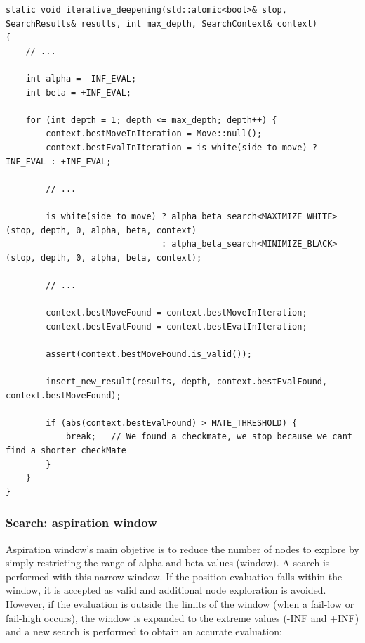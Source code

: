 \vspace{1em}

\begin{lstlisting}[breaklines=true, frame=single, caption={Iterative deepening.}]
static void iterative_deepening(std::atomic<bool>& stop, SearchResults& results, int max_depth, SearchContext& context)
{
    // ...

    int alpha = -INF_EVAL;
    int beta = +INF_EVAL;

    for (int depth = 1; depth <= max_depth; depth++) {
        context.bestMoveInIteration = Move::null();
        context.bestEvalInIteration = is_white(side_to_move) ? -INF_EVAL : +INF_EVAL;

        // ...

        is_white(side_to_move) ? alpha_beta_search<MAXIMIZE_WHITE>(stop, depth, 0, alpha, beta, context)
                               : alpha_beta_search<MINIMIZE_BLACK>(stop, depth, 0, alpha, beta, context);

        // ...

        context.bestMoveFound = context.bestMoveInIteration;
        context.bestEvalFound = context.bestEvalInIteration;

        assert(context.bestMoveFound.is_valid());

        insert_new_result(results, depth, context.bestEvalFound, context.bestMoveFound);

        if (abs(context.bestEvalFound) > MATE_THRESHOLD) {
            break;   // We found a checkmate, we stop because we cant find a shorter checkMate
        }
    }
}
\end{lstlisting}

\subsubsection{Search: aspiration window}

Aspiration window's main objetive is to reduce the number of nodes to explore by simply restricting the range of alpha and beta values (window). A search is performed with this narrow window. If the position evaluation falls within the window, it is accepted as valid and additional node exploration is avoided. However, if the evaluation is outside the limits of the window (when a fail-low or fail-high occurs), the window is expanded to the extreme values (-INF and +INF) and a new search is performed to obtain an accurate evaluation:

